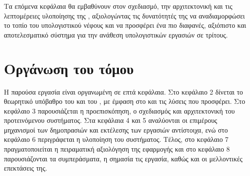 Τα επόμενα κεφάλαια θα εμβαθύνουν στον σχεδιασμό, την αρχιτεκτονική και 
τις λεπτομέρειες υλοποίησης της , αξιολογώντας τις δυνατότητές της 
να αναδιαμορφώσει το τοπίο του υπολογιστικού νέφους και να προσφέρει ένα 
πιο διαφανές, αξιόπιστο και αποτελεσματικό σύστημα για την ανάθεση 
υπολογιστικών εργασιών σε τρίτους.



\section{Οργάνωση του τόμου}
Η παρούσα εργασία είναι οργανωμένη σε επτά κεφάλαια. Στο κεφάλαιο 2 δίνεται το θεωρητικό υπόβαθρο του  και του , με έμφαση στο  και τις λύσεις που προσφέρει. Στο κεφάλαιο 3 παρουσιάζεται η προεπισκόπηση, ο σχεδιασμός και αρχιτεκτονική του προτεινόμενου συστήματος. Στα κεφάλαια 4 και 5 αναλύονται οι επιμέρους μηχανισμοί των δημοπρασιών και εκτέλεσης των εργασιών αντίστοιχα, ενώ στο κεφάλαιο 6 περιγράφεται η υλοποίηση του συστήματος. Τέλος, στο κεφάλαιο 7 πραγματοποιείται η πειραματική αξιολόγηση της εφαρμογής και στο κεφάλαιο 8 παρουσιάζονται τα συμπεράσματα, η σημασία τις εργασία, καθώς και οι μελλοντικές επεκτάσεις της.